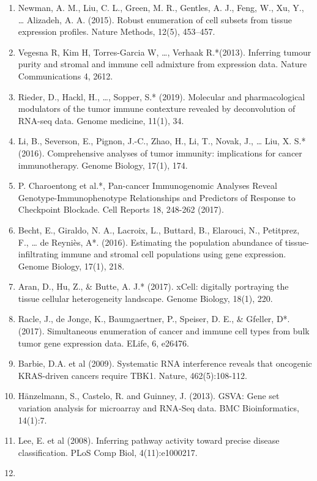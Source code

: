 \documentclass[
  12pt,
]{book}
\theoremstyle{definition}
\theoremstyle{definition}
\theoremstyle{definition}
\theoremstyle{definition}
\theoremstyle{remark}
\begin{document}
\begin{enumerate}
\def\labelenumi{\arabic{enumi}.}
\item
  Newman, A. M., Liu, C. L., Green, M. R., Gentles, A. J., Feng, W., Xu, Y., \ldots{} Alizadeh, A. A. (2015). Robust enumeration of cell subsets from tissue expression profiles. Nature Methods, 12(5), 453--457.
\item
  Vegesna R, Kim H, Torres-Garcia W, \ldots, Verhaak R.*(2013). Inferring tumour purity and stromal and immune cell admixture from expression data. Nature Communications 4, 2612.
\item
  Rieder, D., Hackl, H., \ldots, Sopper, S.* (2019). Molecular and pharmacological modulators of the tumor immune contexture revealed by deconvolution of RNA-seq data. Genome medicine, 11(1), 34.
\item
  Li, B., Severson, E., Pignon, J.-C., Zhao, H., Li, T., Novak, J., \ldots{} Liu, X. S.* (2016). Comprehensive analyses of tumor immunity: implications for cancer immunotherapy. Genome Biology, 17(1), 174.
\item
  P. Charoentong et al.*, Pan-cancer Immunogenomic Analyses Reveal Genotype-Immunophenotype Relationships and Predictors of Response to Checkpoint Blockade. Cell Reports 18, 248-262 (2017).
\item
  Becht, E., Giraldo, N. A., Lacroix, L., Buttard, B., Elarouci, N., Petitprez, F., \ldots{} de Reyniès, A*. (2016). Estimating the population abundance of tissue-infiltrating immune and stromal cell populations using gene expression. Genome Biology, 17(1), 218.
\item
  Aran, D., Hu, Z., \& Butte, A. J.* (2017). xCell: digitally portraying the tissue cellular heterogeneity landscape. Genome Biology, 18(1), 220.
\item
  Racle, J., de Jonge, K., Baumgaertner, P., Speiser, D. E., \& Gfeller, D*. (2017). Simultaneous enumeration of cancer and immune cell types from bulk tumor gene expression data. ELife, 6, e26476.
\item
  Barbie, D.A. et al (2009). Systematic RNA interference reveals that oncogenic KRAS-driven cancers require TBK1. Nature, 462(5):108-112.
\item
  Hänzelmann, S., Castelo, R. and Guinney, J. (2013). GSVA: Gene set variation analysis for microarray and RNA-Seq data. BMC Bioinformatics, 14(1):7.
\item
  Lee, E. et al (2008). Inferring pathway activity toward precise disease classification. PLoS Comp Biol, 4(11):e1000217.
\item

\end{enumerate}
\end{document}
